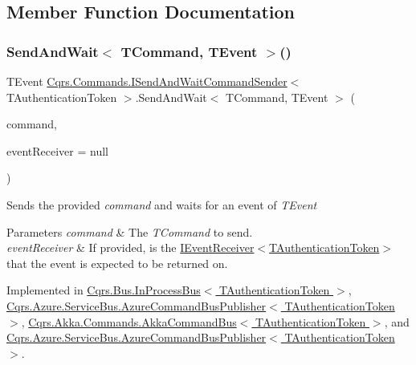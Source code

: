 \subsection{Member Function Documentation}
\mbox{\label{interfaceCqrs_1_1Commands_1_1ISendAndWaitCommandSender_ab64dd5144f0688b0e23ffe289d4ffa2e}} 
\subsubsection{\texorpdfstring{Send\+And\+Wait$<$ T\+Command, T\+Event $>$()}{SendAndWait< TCommand, TEvent >()}\hspace{0.1cm}{\footnotesize\ttfamily [1/6]}}
{\footnotesize\ttfamily T\+Event \hyperlink{interfaceCqrs_1_1Commands_1_1ISendAndWaitCommandSender}{Cqrs.\+Commands.\+I\+Send\+And\+Wait\+Command\+Sender}$<$ T\+Authentication\+Token $>$.Send\+And\+Wait$<$ T\+Command, T\+Event $>$ (\begin{DoxyParamCaption}\item[{T\+Command}]{command,  }\item[{\hyperlink{interfaceCqrs_1_1Events_1_1IEventReceiver}{I\+Event\+Receiver}$<$ T\+Authentication\+Token $>$}]{event\+Receiver = {\ttfamily null} }\end{DoxyParamCaption})}



Sends the provided {\itshape command}  and waits for an event of {\itshape T\+Event}  


\begin{DoxyParams}{Parameters}
{\em command} & The {\itshape T\+Command}  to send.\\
\hline
{\em event\+Receiver} & If provided, is the \hyperlink{interfaceCqrs_1_1Events_1_1IEventReceiver}{I\+Event\+Receiver$<$\+T\+Authentication\+Token$>$} that the event is expected to be returned on.\\
\hline
\end{DoxyParams}


Implemented in \hyperlink{classCqrs_1_1Bus_1_1InProcessBus_a506d617dc7ec3838791a91e09b73b8ce}{Cqrs.\+Bus.\+In\+Process\+Bus$<$ T\+Authentication\+Token $>$}, \hyperlink{classCqrs_1_1Azure_1_1ServiceBus_1_1AzureCommandBusPublisher_a6051d608d81618549709731471ca904a}{Cqrs.\+Azure.\+Service\+Bus.\+Azure\+Command\+Bus\+Publisher$<$ T\+Authentication\+Token $>$}, \hyperlink{classCqrs_1_1Akka_1_1Commands_1_1AkkaCommandBus_a10ed94fc318977777e2e6cc970b8953e}{Cqrs.\+Akka.\+Commands.\+Akka\+Command\+Bus$<$ T\+Authentication\+Token $>$}, and \hyperlink{classCqrs_1_1Azure_1_1ServiceBus_1_1AzureCommandBusPublisher_a6051d608d81618549709731471ca904a}{Cqrs.\+Azure.\+Service\+Bus.\+Azure\+Command\+Bus\+Publisher$<$ T\+Authentication\+Token $>$}.

